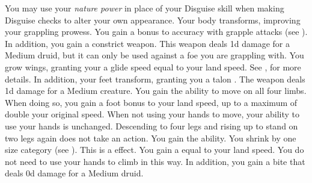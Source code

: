         You may use your \textit{nature power} in place of your Disguise skill when making Disguise checks to alter your own appearance.
        Your body transforms, improving your grappling prowess.
        You gain a  bonus to accuracy with grapple attacks (see ).
        In addition, you gain a constrict weapon.
        This weapon deals \plus1d damage for a Medium druid, but it can only be used against a foe you are grappling with.
        You grow wings, granting your a glide speed equal to your land speed.
        See , for more details.
        In addition, your feet transform, granting you a talon .
        The weapon deals \minus1d damage for a Medium creature.
        You gain the ability to move on all four limbs.
        When doing so, you gain a  foot bonus to your land speed, up to a maximum of double your original speed.
        When not using your hands to move, your ability to use your hands is unchanged.
        Descending to four legs and rising up to stand on two legs again does not take an action.
        You gain the  ability.
        You shrink by one size category (see ).
        This is a  effect.
        You gain a  equal to your land speed.
        You do not need to use your hands to climb in this way.
        In addition, you gain a bite  that deals \plus0d damage for a Medium druid.


